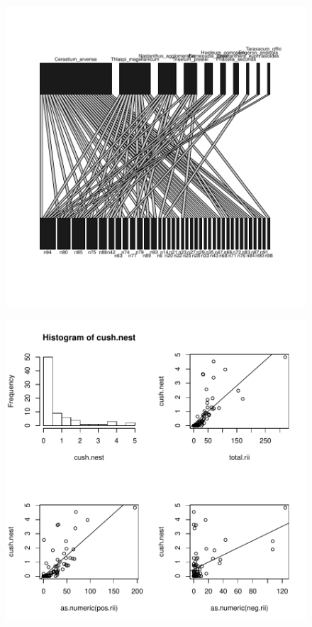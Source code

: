\documentclass[12pt]{article}
\begin{document}
\begin{figure} 
\begin{center} 
\includegraphics{GoFN-fig2}
\end{center} 
\caption{}
\label{fig:two}
\end{figure}

\begin{figure} 
\begin{center} 
\includegraphics{GoFN-fig3}
\end{center} 
\caption{}
\label{fig:three}
\end{figure}
\end{document}
